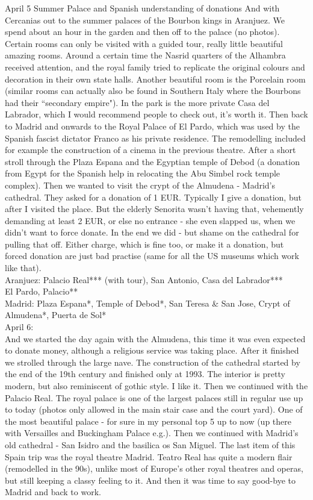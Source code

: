 April 5 Summer Palace and Spanish understanding of donations
And with Cercanias out to the summer palaces of the Bourbon kings in Aranjuez. We spend about an hour in the garden and then off to the palace (no photos). Certain rooms can only be visited with a guided tour, really little beautiful amazing rooms. Around a certain time the Nasrid quarters of the Alhambra received attention, and the royal family tried to replicate the original colours and decoration in their own state halls. Another beautiful room is the Porcelain room (similar rooms can actually also be found in Southern Italy where the Bourbons had their ``secondary empire"). In the park is the more private Casa del Labrador, which I would recommend people to check out, it's worth it. Then back to Madrid and onwards to the Royal Palace of El Pardo, which was used by the Spanish fascist dictator Franco as his private residence. The remodelling included for example the construction of a cinema in the previous theatre. After a short stroll through the Plaza Espana and the Egyptian temple of Debod (a donation from Egypt for the Spanish help in relocating the Abu Simbel rock temple complex). Then we wanted to visit the crypt of the Almudena - Madrid's cathedral. They asked for a donation of 1 EUR. Typically I give a donation, but after I visited the place. But the elderly Senorita wasn't having that, vehemently demanding at least 2 EUR, or else no entrance - she even slapped us, when we didn't want to force donate. In the end we did - but shame on the cathedral for pulling that off. Either charge, which is fine too, or make it a donation, but forced donation are just bad practise (same for all the US museums which work like that).\\

Aranjuez:
Palacio Real*** (with tour),
San Antonio,
Casa del Labrador***\\
El Pardo, Palacio**\\
Madrid:
Plaza Espana*, 
Temple of Debod*,
San Teresa \& San Jose,
Crypt of Almudena*,
Puerta de Sol*\\

April 6:\\
And we started the day again with the Almudena, this time it was even expected to donate money, although a religious service was taking place. After it finished we strolled through the large nave. The construction of the cathedral started by the end of the 19th century and finished only at 1993. The interior is pretty modern, but also reminiscent of gothic style. I like it. Then we continued with the Palacio Real. The royal palace is one of the largest palaces still in regular use up to today (photos only allowed in the main stair case and the court yard). One of the most beautiful palace - for sure in my personal top 5 up to now (up there with Versailles and Buckingham Palace e.g.). Then we continued with Madrid's old cathedral - San Isidro and the basilica os San Miguel. The last item of this Spain trip was the royal theatre
Madrid. Teatro Real has quite a modern flair (remodelled in the 90s), unlike most of Europe's other royal theatres and operas, but still keeping a classy feeling to it. And then it was time to say good-bye to Madrid and back to work.\\

